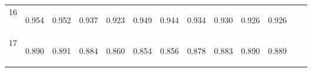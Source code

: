 \begin{center}
\begin{tabular}{lcccccccccccc}
16 & \begin{bf}0.954\end{bf} & \begin{rm}0.952\end{rm} & \begin{bf}0.937\end{bf} & \begin{rm}0.923\end{rm} & \begin{bf}0.949\end{bf} & \begin{rm}0.944\end{rm} & \begin{bf}0.934\end{bf} & \begin{rm}0.930\end{rm} & \begin{bf}0.926\end{bf} & \begin{rm}0.926\end{rm} & \begin{bf}\end{bf} & \begin{rm}\end{rm}\\
17 & \begin{bf}0.890\end{bf} & \begin{rm}0.891\end{rm} & \begin{bf}0.884\end{bf} & \begin{rm}0.860\end{rm} & \begin{bf}0.854\end{bf} & \begin{rm}0.856\end{rm} & \begin{bf}0.878\end{bf} & \begin{rm}0.883\end{rm} & \begin{bf}0.890\end{bf} & \begin{rm}0.889\end{rm} & \begin{bf}\end{bf} & \begin{rm}\end{rm}\\

\end{tabular}
\end{center}
